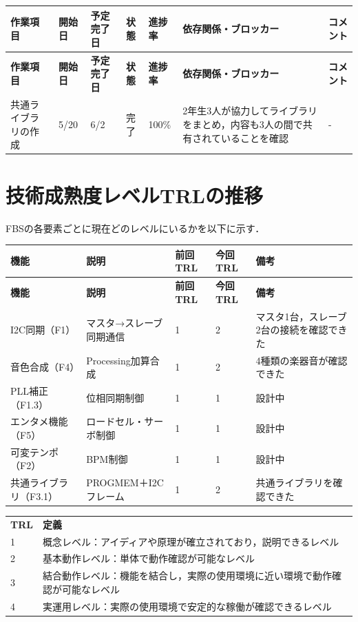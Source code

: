 \documentclass[a4paper,12pt]{ltjsarticle}
\begin{document}
\begin{longtable}{C{2cm}C{1.6cm}C{1.6cm}C{2.2cm}C{1.2cm}L{2.4cm}L{3cm}}
  \toprule
  \textbf{作業項目} & \textbf{開始日} & \textbf{予定完了日} & \textbf{状態} & \textbf{進捗率} & \textbf{依存関係・ブロッカー} & \textbf{コメント} \\
  \midrule
  \endfirsthead
  \toprule
  \textbf{作業項目} & \textbf{開始日} & \textbf{予定完了日} & \textbf{状態} & \textbf{進捗率} & \textbf{依存関係・ブロッカー} & \textbf{コメント} \\
  \midrule
  \endhead
  \midrule
  \endfoot
  \bottomrule
  \endlastfoot
  共通ライブラリの作成 & 5/20 & 6/2 & 完了 & 100\% & 2年生3人が協力してライブラリをまとめ，内容も3人の間で共有されていることを確認 & - \\
\end{longtable}

\section{技術成熟度レベルTRLの推移} \label{trl}
FBSの各要素ごとに現在どのレベルにいるかを以下に示す．

\begin{longtable}{L{2.5cm}L{4cm}C{2cm}C{2cm}L{3.5cm}}
  \toprule
  \textbf{機能} & \textbf{説明} & \textbf{前回TRL} & \textbf{今回TRL} & \textbf{備考} \\
  \midrule
  \endfirsthead
  \toprule
  \textbf{機能} & \textbf{説明} & \textbf{前回TRL} & \textbf{今回TRL} & \textbf{備考} \\
  \midrule
  \endhead
  \midrule
  \endfoot
  \bottomrule
  \endlastfoot
  I2C同期（F1） & マスタ→スレーブ同期通信 & 1 & 2 & マスタ1台，スレーブ2台の接続を確認できた \\
  音色合成（F4） & Processing加算合成 & 1 & 2 & 4種類の楽器音が確認できた \\
  PLL補正（F1.3） & 位相同期制御 & 1 & 1 & 設計中 \\
  エンタメ機能（F5） & ロードセル・サーボ制御 & 1 & 1 & 設計中 \\
  可変テンポ（F2） & BPM制御 & 1 & 1 & 設計中 \\
  共通ライブラリ（F3.1） & PROGMEM＋I2Cフレーム & 1 & 2 & 共通ライブラリを確認できた \\
\end{longtable}

\noindent
{\small
\begin{tabular}{ll}
  \textbf{TRL} & \textbf{定義} \\
  1 & 概念レベル：アイディアや原理が確立されており，説明できるレベル \\
  2 & 基本動作レベル：単体で動作確認が可能なレベル \\
  3 & 結合動作レベル：機能を結合し，実際の使用環境に近い環境で動作確認が可能なレベル \\
  4 & 実運用レベル：実際の使用環境で安定的な稼働が確認できるレベル \\
\end{tabular}
}
\end{document}
